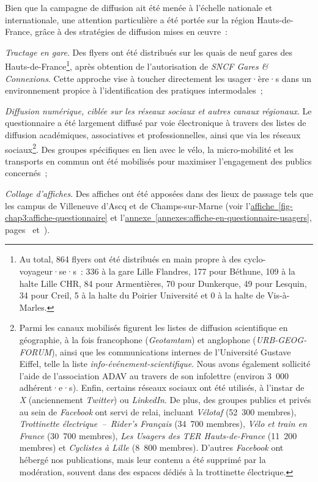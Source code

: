 \begin{refsegment}
Bien que la campagne de diffusion ait été menée à l’échelle nationale et internationale, une attention particulière a été portée sur la région Hauts-de-France, grâce à des stratégies de diffusion mises en œuvre~: 
\begin{customitemize}
    \item \textsl{Tractage en gare}. Des flyers ont été distribués sur les quais de neuf gares des Hauts-de-France\footnote{
        Au total, 864 flyers ont été distribués en main propre à des cyclo-voyageur·se·s~: 336 à la gare Lille Flandres, 177 pour Béthune, 109 à la halte Lille CHR, 84 pour Armentières, 70 pour Dunkerque, 49 pour Lesquin, 34 pour Creil, 5 à la halte du Poirier Université et 0 à la halte de Vis-à-Marles.
    }, après obtention de l’autorisation de \textsl{SNCF Gares \& Connexions}. Cette approche vise à toucher directement les usager·ère·s dans un environnement propice à l’identification des pratiques intermodales~;
    \item \textsl{Diffusion numérique, ciblée sur les réseaux sociaux et autres canaux régionaux}. Le questionnaire a été largement diffusé par voie électronique à travers des listes de diffusion académiques, associatives et professionnelles, ainsi que via les réseaux sociaux\footnote{
        Parmi les canaux mobilisés figurent les listes de diffusion scientifique en géographie, à la fois francophone (\textsl{Geotamtam}) et anglophone (\textsl{URB-GEOG-FORUM}), ainsi que les communications internes de l'Université Gustave Eiffel, telle la liste \textsl{info-événement-scientifique}. Nous avons également sollicité l'aide de l'association \acrfull{ADAV} au travers de son infolettre (environ 3~000 adhérent·e·s). Enfin, certains réseaux sociaux ont été utilisés, à l'instar de \textsl{X} (anciennement \textsl{Twitter}) ou \textsl{LinkedIn}. De plus, des groupes publics et privés au sein de \textsl{Facebook} ont servi de relai, incluant \textsl{Vélotaf} (52~300 membres), \textsl{Trottinette électrique~–~Rider's Français} (34~700 membres), \textsl{Vélo et train en France} (30~700 membres), \textsl{Les Usagers des TER Hauts-de-France} (11~200 membres) et \textsl{Cyclistes à Lille} (8~800 membres). D'autres  \textsl{Facebook} ont hébergé nos publications, mais leur contenu a été supprimé par la modération, souvent dans des espaces dédiés à la trottinette électrique.
    }. Des groupes spécifiques en lien avec le vélo, la micro-mobilité et les transports en commun ont été mobilisés pour maximiser l’engagement des publics concernés~;
    \item \textsl{Collage d'affiches}. Des affiches ont été apposées dans des lieux de passage tels que les campus de Villeneuve d’Ascq et de Champs-sur-Marne (voir l'\hyperref[fig-chap3:affiche-questionnaire]{affiche~\ref{fig-chap3:affiche-questionnaire}} et l'\hyperref[annexes:affiche-en-questionnaire-usagers]{annexe~\ref{annexes:affiche-en-questionnaire-usagers}}, pages~\pageref{fig-chap3:affiche-questionnaire} et~\pageref{annexes:affiche-en-questionnaire-usagers}).
\end{customitemize}%


\end{refsegment}
